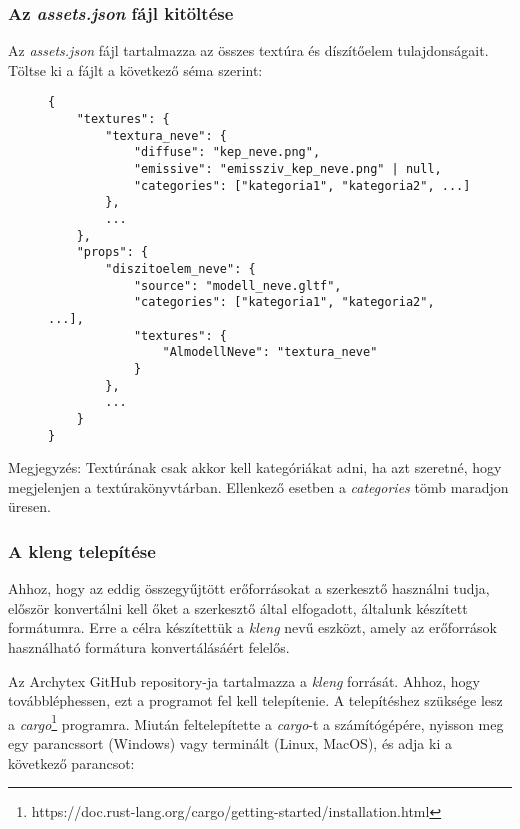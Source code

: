 \pagebreak

\subsubsection{Az \emph{assets.json} fájl kitöltése}

Az \emph{assets.json} fájl tartalmazza az összes textúra és díszítőelem tulajdonságait. Töltse ki
a fájlt a következő séma szerint:

\begin{figure}[h]
    \centering
    \begin{minipage}{.85\textwidth}
        \centering
        \begin{lstlisting}
{
    "textures": {
        "textura_neve": {
            "diffuse": "kep_neve.png",
            "emissive": "emissziv_kep_neve.png" | null,
            "categories": ["kategoria1", "kategoria2", ...]
        },
        ...
    },
    "props": {
        "diszitoelem_neve": {
            "source": "modell_neve.gltf",
            "categories": ["kategoria1", "kategoria2", ...],
            "textures": {
                "AlmodellNeve": "textura_neve"
            }
        },
        ...
    }
}
\end{lstlisting}
    \end{minipage}
\end{figure}

Megjegyzés: Textúrának csak akkor kell kategóriákat adni, ha azt szeretné, hogy megjelenjen a
textúrakönyvtárban. Ellenkező esetben a \emph{categories} tömb maradjon üresen.

\pagebreak

\subsubsection{A kleng telepítése}

Ahhoz, hogy az eddig összegyűjtött erőforrásokat a szerkesztő használni tudja, először konvertálni
kell őket a szerkesztő által elfogadott, általunk készített formátumra. Erre a célra készítettük
a \emph{kleng} nevű eszközt, amely az erőforrások használható formátura konvertálásáért felelős.

Az Archytex GitHub repository-ja tartalmazza a \emph{kleng} forrását. Ahhoz, hogy továbbléphessen,
ezt a programot fel kell telepítenie. A telepítéshez szüksége lesz a
\emph{cargo}\footnote{https://doc.rust-lang.org/cargo/getting-started/installation.html}
programra. Miután feltelepítette a \emph{cargo}-t a számítógépére, nyisson meg egy parancssort
(Windows) vagy terminált (Linux, MacOS), és adja ki a következő parancsot:

